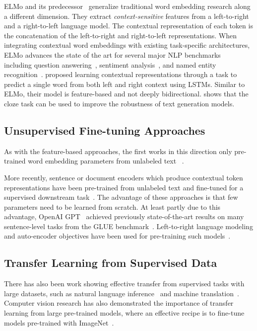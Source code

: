 ELMo and its predecessor~\cite{peters-etal:2017:_semi, peters-etal:2018:_deep} generalize traditional word embedding research along a different dimension. They extract \emph{context-sensitive} features from a left-to-right and a right-to-left language model. The contextual representation of each token is the concatenation of the left-to-right and right-to-left representations. When integrating contextual word embeddings with existing task-specific architectures, ELMo advances the state of the art for several major NLP benchmarks~\cite{peters-etal:2018:_deep} including question answering~\cite{rajpurkar-etal:2016:_squad}, sentiment analysis~\cite{socher-etal:2013:_recur}, and named entity recognition~\cite{tjong-de:2003}.
\citet{melamud2016context2vec} proposed learning contextual representations through a task to predict a single word from both left and right context
using LSTMs. Similar to ELMo, their model is feature-based and not deeply bidirectional. 
\citet{fedus2018maskgan} shows that the cloze task can be used to improve the robustness of text generation models. 




\subsection{Unsupervised Fine-tuning Approaches}

As with the feature-based approaches, the first works in this direction only pre-trained word embedding parameters from unlabeled text ~\cite{collobert-weston:2008}.  

More recently, sentence or document encoders which produce contextual token representations have been pre-trained from unlabeled text and fine-tuned for a supervised downstream task~\cite{dai-le:2015:_semi, howard-ruder:2018, radford-etal:2018}.  The advantage of these approaches is that few parameters need to be learned from scratch. At least partly due to this advantage, OpenAI GPT~\cite{radford-etal:2018} achieved previously state-of-the-art results on many sentence-level tasks from the GLUE benchmark~\cite{wang-etal:2018:_glue}.  Left-to-right language modeling and auto-encoder objectives have been used for pre-training such models~\cite{howard-ruder:2018, radford-etal:2018,dai-le:2015:_semi}.





\subsection{Transfer Learning from Supervised Data}

There has also been work showing effective transfer from supervised tasks with large datasets, such as natural language inference~\cite{conneau-EtAl:2017:EMNLP2017} and machine translation~\cite{mccann-etal:2017:_learn_trans}. 
Computer vision research has also demonstrated the importance of transfer learning from large pre-trained models, where an effective recipe is to fine-tune models pre-trained with ImageNet~\cite{imagenet_cvpr09, yosinski2014transferable}. 



